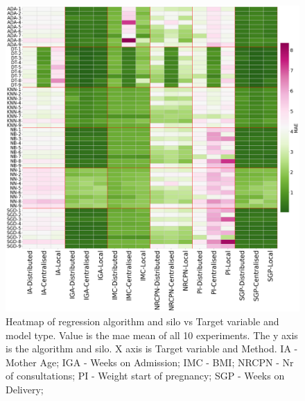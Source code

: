\begin{figure}[htbp]
\centering
\captionsetup{justification=centering}

\caption[Heatmap of regression algorithm and silo vs Target variable and model type.]{Heatmap of regression algorithm and silo vs Target variable and model type. Value is the \ac{mae} mean of all 10 experiments. The y axis is the algorithm and silo. X axis is Target variable and Method. IA - Mother Age; IGA - Weeks on Admission; IMC - BMI; NRCPN - Nr of consultations; PI - Weight start of pregnancy; SGP - Weeks on Delivery;}\label{fig:heatmpa-int} 
\includegraphics[scale=0.22]{figures/heatmap-reg.png}
\end{figure}

